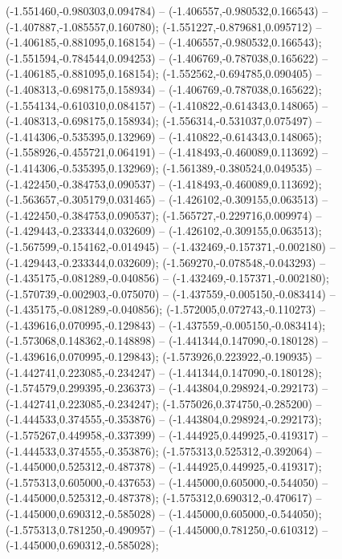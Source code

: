  (-1.551460,-0.980303,0.094784) -- (-1.406557,-0.980532,0.166543) -- (-1.407887,-1.085557,0.160780);
 (-1.551227,-0.879681,0.095712) -- (-1.406185,-0.881095,0.168154) -- (-1.406557,-0.980532,0.166543);
 (-1.551594,-0.784544,0.094253) -- (-1.406769,-0.787038,0.165622) -- (-1.406185,-0.881095,0.168154);
 (-1.552562,-0.694785,0.090405) -- (-1.408313,-0.698175,0.158934) -- (-1.406769,-0.787038,0.165622);
 (-1.554134,-0.610310,0.084157) -- (-1.410822,-0.614343,0.148065) -- (-1.408313,-0.698175,0.158934);
 (-1.556314,-0.531037,0.075497) -- (-1.414306,-0.535395,0.132969) -- (-1.410822,-0.614343,0.148065);
 (-1.558926,-0.455721,0.064191) -- (-1.418493,-0.460089,0.113692) -- (-1.414306,-0.535395,0.132969);
 (-1.561389,-0.380524,0.049535) -- (-1.422450,-0.384753,0.090537) -- (-1.418493,-0.460089,0.113692);
 (-1.563657,-0.305179,0.031465) -- (-1.426102,-0.309155,0.063513) -- (-1.422450,-0.384753,0.090537);
 (-1.565727,-0.229716,0.009974) -- (-1.429443,-0.233344,0.032609) -- (-1.426102,-0.309155,0.063513);
 (-1.567599,-0.154162,-0.014945) -- (-1.432469,-0.157371,-0.002180) -- (-1.429443,-0.233344,0.032609);
 (-1.569270,-0.078548,-0.043293) -- (-1.435175,-0.081289,-0.040856) -- (-1.432469,-0.157371,-0.002180);
 (-1.570739,-0.002903,-0.075070) -- (-1.437559,-0.005150,-0.083414) -- (-1.435175,-0.081289,-0.040856);
 (-1.572005,0.072743,-0.110273) -- (-1.439616,0.070995,-0.129843) -- (-1.437559,-0.005150,-0.083414);
 (-1.573068,0.148362,-0.148898) -- (-1.441344,0.147090,-0.180128) -- (-1.439616,0.070995,-0.129843);
 (-1.573926,0.223922,-0.190935) -- (-1.442741,0.223085,-0.234247) -- (-1.441344,0.147090,-0.180128);
 (-1.574579,0.299395,-0.236373) -- (-1.443804,0.298924,-0.292173) -- (-1.442741,0.223085,-0.234247);
 (-1.575026,0.374750,-0.285200) -- (-1.444533,0.374555,-0.353876) -- (-1.443804,0.298924,-0.292173);
 (-1.575267,0.449958,-0.337399) -- (-1.444925,0.449925,-0.419317) -- (-1.444533,0.374555,-0.353876);
 (-1.575313,0.525312,-0.392064) -- (-1.445000,0.525312,-0.487378) -- (-1.444925,0.449925,-0.419317);
 (-1.575313,0.605000,-0.437653) -- (-1.445000,0.605000,-0.544050) -- (-1.445000,0.525312,-0.487378);
 (-1.575312,0.690312,-0.470617) -- (-1.445000,0.690312,-0.585028) -- (-1.445000,0.605000,-0.544050);
 (-1.575313,0.781250,-0.490957) -- (-1.445000,0.781250,-0.610312) -- (-1.445000,0.690312,-0.585028);
